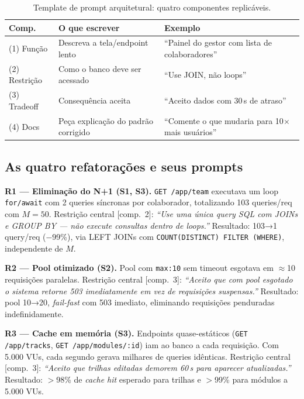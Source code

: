 \documentclass[sigconf]{acmart}
\begin{document}
\begin{table}[t]
  \caption{Template de prompt arquitetural: quatro componentes replicáveis.}
  \label{tab:modelo_prompt}
  \small
  \begin{tabular}{p{1.1cm}p{2.6cm}p{2.9cm}}
    \toprule
    \textbf{Comp.} & \textbf{O que escrever} & \textbf{Exemplo} \\
    \midrule
    (1) Função & Descreva a tela/endpoint lento & ``Painel do gestor com lista de colaboradores'' \\
    (2) Restrição & Como o banco deve ser acessado & ``Use JOIN, não loops'' \\
    (3) Tradeoff & Consequência aceita & ``Aceito dados com 30\,s de atraso'' \\
    (4) Docs & Peça explicação do padrão corrigido & ``Comente o que mudaria para 10$\times$ mais usuários'' \\
    \bottomrule
  \end{tabular}
\end{table}

\subsection{As quatro refatorações e seus prompts}

\textbf{R1 — Eliminação do N+1 (S1, S3).} \texttt{GET /app/team} executava um
loop \texttt{for/await} com 2 queries síncronas por colaborador, totalizando 103
queries/req com $M=50$. Restrição central [comp.~2]: \textit{``Use uma única query
SQL com JOINs e GROUP BY --- não execute consultas dentro de loops.''}
Resultado: 103→1 query/req (−99\%), via LEFT JOINs com
\texttt{COUNT(DISTINCT) FILTER (WHERE)}, independente de $M$.

\textbf{R2 — Pool otimizado (S2).} Pool com \texttt{max:10} sem timeout esgotava
em $\approx$10 requisições paralelas. Restrição central [comp.~3]: \textit{``Aceito
que com pool esgotado o sistema retorne 503 imediatamente em vez de requisições
suspensas.''} Resultado: pool 10→20, \textit{fail-fast} com 503 imediato,
eliminando requisições penduradas indefinidamente.

\textbf{R3 — Cache em memória (S3).} Endpoints quase-estáticos (\texttt{GET /app/tracks},
\texttt{GET /app/modules/:id}) iam ao banco a cada requisição. Com 5.000 VUs, cada
segundo gerava milhares de queries idênticas. Restrição central [comp.~3]:
\textit{``Aceito que trilhas editadas demorem 60\,s para aparecer atualizadas.''}
Resultado: $>$98\% de \textit{cache hit} esperado para trilhas e $>$99\% para
módulos a 5.000 VUs.
\end{document}
